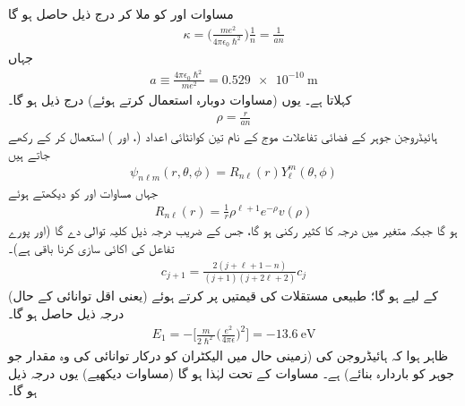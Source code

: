  مساوات  اور  کو ملا کر درج ذیل حاصل ہو گا
\begin{align}
\kappa =\big(\frac{me^{2}}{4\pi\epsilon_{0}\hslash^{2}}\big)\frac{1}{n}=\frac{1}{an} 
\end{align}
جہاں
\begin{align}\label{مساوات_تین_ابعادی_رداس_بوہر}
a\equiv\frac{4\pi\epsilon_{0}\hslash^{2}}{me^{2}}=\SI{0.529e-10}{\meter}
\end{align}
 کہلاتا ہے۔ یوں (مساوات  دوبارہ استعمال کرتے ہوئے) درج ذیل ہو گا۔
\begin{align}
\rho=\frac{r}{an} 
\end{align}
ہائیڈروجن جوہر کے فضائی تفاعلات موج کے نام تین کوانٹائی اعداد (،  اور ) استعمال کر کے رکھے جاتے ہیں 
 \begin{align}
\psi_{n\ell m}(r,\theta,\phi)=R_{n\ell}(r)Y_{\ell}^{m}(\theta,\phi) 
\end{align}
 جہاں مساوات  اور  کو دیکھتے ہوئے
 \begin{align}
R_{n\ell}(r)=\frac{1}{r}\rho^{\ell+1}e^{-\rho}v(\rho) 
\end{align} 
 ہو گا جبکہ  متغیر  میں درجہ  کا کثیر رکنی ہو گا، جس کے  ضریب  درجہ ذیل کلیہ توالی دے گا (اور پورے تفاعل کی اکائی سازی کرنا باقی ہے)۔
 \begin{align}\label{مساوات_ابعادی_کلیہ_توالی_کولمب_مخفیہ}
c_{j+1}=\frac{2(j+\ell+1-n)}{(j+1)(j+2\ell+2)}c_{j} 
\end{align}
 (یعنی اقل توانائی کے حال) کے لیے 
  ہو گا؛ طبیعی مستقلات کی قیمتیں پر کرتے ہوئے درجہ ذیل حاصل ہو گا۔
 \begin{align}\label{مساوات_تین_ابعاد_ہائیڈروجن_بندشی_توانائی}
E_{1}=-\big[\frac{m}{2\hslash^{2}}\big(\frac{e^{2}}{4\pi\epsilon}\big)^{2}\big]=\SI{-13.6}{\electronvolt}
\end{align}
 ظاہر ہوا کہ ہائیڈروجن کی  (زمینی حال میں الیکٹران کو درکار توانائی کی وہ مقدار جو جوہر کو باردارہ بنائے)  ہے۔ مساوات  کے تحت  لہٰذا  ہو گا (مساوات  دیکھیے) یوں درجہ ذیل ہو گا۔
